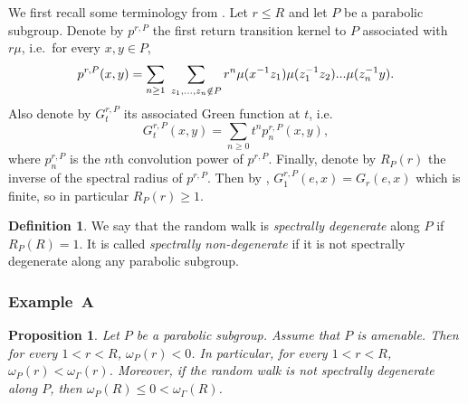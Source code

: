 \documentclass{amsart}
\newtheorem{prop}[thm]{Proposition}
\theoremstyle{definition}
\newtheorem{defn}[thm]{Definition}
\theoremstyle{remark}
\begin{document}
We first recall some terminology from \cite{DG21}.
Let $r\leq R$ and let $P$ be a parabolic subgroup.
Denote by $p^{r,P}$ the first return transition kernel to $P$ associated with $r\mu$, i.e.\ for every $x,y\in P$,
\begin{equation}\label{deffirstreturnkernel}
p^{r,P}(x,y)=\sum_{n\geq 1}\hspace{.1cm}\sum_{z_1,...,z_n\notin P}r^n\mu(x^{-1}z_1)\mu(z_1^{-1}z_2)...\mu(z_n^{-1}y).
\end{equation}
Also denote by $G_t^{r,P}$ its associated Green function at $t$, i.e.
$$G_t^{r,P}(x,y)=\sum_{n\geq 0}t^np_n^{r,P}(x,y),$$
where $p^{r,P}_n$ is the $n$th convolution power of $p^{r,P}$.
Finally, denote by $R_P(r)$ the inverse of the spectral radius of $p^{r,P}$.
Then by \cite[Lemma~4.4]{DG21}, $G_1^{r,P}(e,x)=G_r(e,x)$ which is finite, so in particular $R_P(r)\geq 1$.

\begin{defn}\label{defnspectraldegeneracy}
We say that the random walk is \textit{spectrally degenerate} along $P$ if $R_P(R)=1$.
It is called \textit{spectrally non-degenerate} if it is not spectrally degenerate along any parabolic subgroup.
\end{defn}


\subsubsection{Example~A}
\begin{prop}
Let $P$ be a parabolic subgroup.
Assume that $P$ is amenable.
Then for every $1<r< R$, $\omega_P(r)< 0$.
In particular, for every $1<r< R$, $\omega_P(r)<\omega_\Gamma(r)$.
Moreover, if the random walk is not spectrally degenerate along $P$, then $\omega_P(R)\leq 0<\omega_\Gamma(R)$.
\end{prop}
\end{document}
